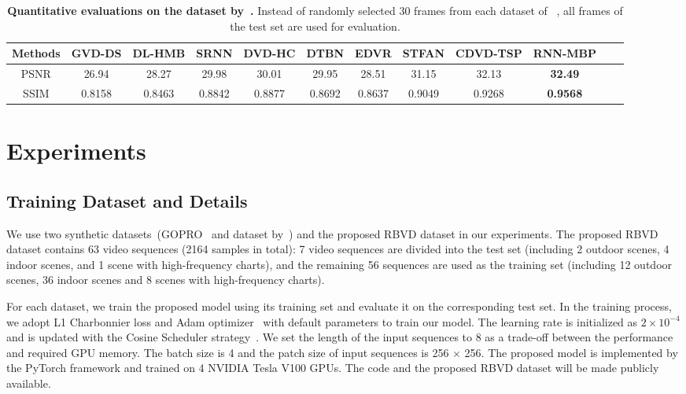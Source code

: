 \documentclass[letterpaper]{article} \usepackage{aaai22}  \usepackage{times}  \usepackage{helvet}  \usepackage{courier}  \usepackage[hyphens]{url}  \usepackage{graphicx} \urlstyle{rm} \def\UrlFont{\rm}  \usepackage{natbib}  \usepackage{caption} \DeclareCaptionStyle{ruled}{labelfont=normalfont,labelsep=colon,strut=off} \frenchspacing  \setlength{\pdfpagewidth}{8.5in}  \setlength{\pdfpageheight}{11in}  \newcommand{\hang}{\textcolor[rgb]{0.98,0.5,0.04}}
\begin{document}
\begin{table*}[!t] 
\centering
\vspace{-2mm}
\begin{adjustbox}{width=0.90\linewidth}
\begin{tabular}{c|c c c c c c c c c c c}
    \hline
    {\bf Methods}  & GVD-DS          & DL-HMB        & SRNN         & DVD-HC      & DTBN         & EDVR      & STFAN    & CDVD-TSP    & RNN-MBP           \\
    \hline  
    PSNR           & 26.94           & 28.27         & 29.98        & 30.01       & 29.95        & 28.51     & 31.15    & 32.13       & {\bf 32.49}    \\
    SSIM           & 0.8158          & 0.8463        & 0.8842       & 0.8877      & 0.8692       & 0.8637    & 0.9049   & 0.9268      & {\bf 0.9568}   \\
    \hline
\end{tabular}
\end{adjustbox}
\vspace{-2mm}
\caption{{\bf Quantitative evaluations on the dataset by~\cite{Su_2017_CVPR}.} Instead of randomly selected 30 frames from each dataset of ~\cite{Su_2017_CVPR}, all frames of the test set are used for evaluation.}
\label{DVDTable}
\vspace{-2mm}
\end{table*}


\section{Experiments}
\subsection{Training Dataset and Details}
We use two synthetic datasets~(GOPRO~\cite{deepdeblur} and dataset by~\cite{Su_2017_CVPR}) and the proposed RBVD dataset in our experiments.
The proposed RBVD dataset contains 63 video sequences (2164 samples in total): 7 video sequences are divided into the test set (including 2 outdoor scenes, 4 indoor scenes, and 1 scene with high-frequency charts), and the remaining 56 sequences are used as the training set (including 12 outdoor scenes, 36 indoor scenes and 8 scenes with high-frequency charts). 

For each dataset, we train the proposed model using its training set and evaluate it on the corresponding test set.
In the training process, we adopt L1 Charbonnier loss and Adam optimizer~\cite{2014Adam} with default parameters to train our model.
The learning rate is initialized as $2\times10^{-4}$ and is updated with the Cosine Scheduler strategy~\cite{2016SGDR}. 
We set the length of the input sequences to 8 as a trade-off between the performance and required GPU memory. 
The batch size is 4 and the patch size of input sequences is 256 $\times$ 256.
The proposed model is implemented by the PyTorch framework and trained on 4 NVIDIA Tesla V100 GPUs.
The code and the proposed RBVD dataset will be made publicly available.
\end{document}
